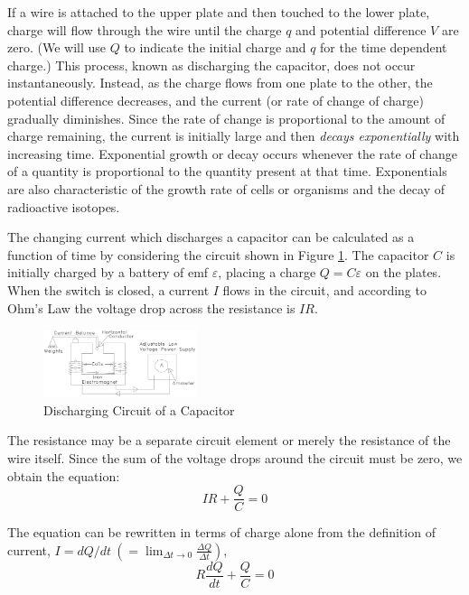 If a wire is attached to the upper plate and then touched to the lower plate, charge will flow through the wire until the charge $q$ and potential difference $V$ are zero. (We will use $Q$ to indicate the initial charge and $q$ for the time dependent charge.) This process, known as discharging the capacitor, does not occur instantaneously. Instead, as the charge flows from one plate to the other, the potential difference decreases, and the current (or rate of change of charge) gradually diminishes. Since the rate of change is proportional to the amount of charge remaining, the current is initially large and then \emph{decays exponentially} with increasing time. Exponential growth or decay occurs whenever the rate of change of a quantity is proportional to the quantity present at that time. Exponentials are also characteristic of the growth rate of cells or organisms and the decay of radioactive isotopes.

The changing current which discharges a capacitor can be calculated as a function of time by considering the circuit shown in Figure  \ref{fig:capcircuit1}. The capacitor $C$ is initially charged by a battery of emf $\varepsilon$, placing a charge $Q = C\varepsilon$ on the plates. When the switch is closed, a current $I$ flows in the circuit, and according to Ohm's Law the voltage drop across the resistance is $IR$.

\begin{figure}[h]
    \begin{center}
        \includegraphics[width=0.4\textwidth]{./Exp4/pic/image2.png}
    \end{center}
    \caption{Discharging Circuit of a Capacitor}
    \label{fig:capcircuit1}
\end{figure}

The resistance may be a separate circuit element or merely the resistance of the wire itself. Since the sum of the voltage drops around the circuit must be zero, we obtain the equation:
\begin{equation}
    IR + \frac{Q}{C} = 0
\end{equation}

The equation can be rewritten in terms of charge alone from the definition of current, $\displaystyle I = dQ/dt \ \left(=\lim_{\Delta t\to 0} \frac{\Delta Q}{\Delta t}\right)$,
\begin{equation}
    R\frac{dQ}{dt} + \frac{Q}{C} = 0
    \label{eqn:diffcharge}
\end{equation}

